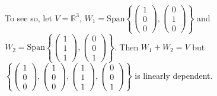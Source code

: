 \documentclass[11pt,openany]{book}
\theoremstyle{plain}
\theoremstyle{definition}
\theoremstyle{remark}
\begin{document}
To see so, let $V = \mathbb{R}^3$, $W_1 = \mathrm{Span}\left\{\begin{pmatrix} 1\\ 0\\0 \end{pmatrix}, \begin{pmatrix} 0\\ 1\\0 \end{pmatrix}\right\}$ and $W_2 = \mathrm{Span}\left\{\begin{pmatrix} 1\\ 1\\1 \end{pmatrix}, \begin{pmatrix} 0\\ 0\\1 \end{pmatrix}\right\}$. Then
$W_1 + W_2 = V$
but $\left\{\begin{pmatrix} 1\\ 0\\0 \end{pmatrix}, \begin{pmatrix} 1\\ 0\\0 \end{pmatrix}, \begin{pmatrix} 1\\ 1\\1 \end{pmatrix}, \begin{pmatrix} 0\\ 0\\1 \end{pmatrix}\right\}$ is linearly dependent.
\end{document}
